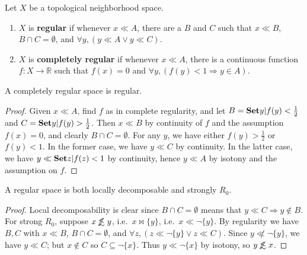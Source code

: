 \documentclass{article}
\def\R{\mathbb{R}}
\def\oapt{\mathrel{\!\not\,\not\lesssim}}
\def\cpl#1{\neg #1}
\let\implies\Rightarrow
\def\singleton#1{\{#1\}}
\begin{document}
\begin{defn}
  Let $X$ be a topological neighborhood space.
  \begin{enumerate}
  \item $X$ is \textbf{regular} if whenever $x\ll A$, there are a $B$ and $C$ such that $x\ll B$, $B\cap C = \emptyset$, and $\forall y, (y\ll A \lor y\ll C)$.
  \item $X$ is \textbf{completely regular} if whenever $x\ll A$, there is a continuous function $f:X\to \R$ such that $f(x)=0$ and $\forall y, (f(y)<1 \implies y\in A)$.
  \end{enumerate}
\end{defn}

\begin{lem}\label{thm:creg-reg}
  A completely regular space is regular.
\end{lem}
\begin{proof}
  Given $x\ll A$, find $f$ as in complete regularity, and let $B = \setof{y|f(y)<\frac12}$ and $C = \setof{y|f(y)>\frac12}$.
  Then $x\ll B$ by continuity of $f$ and the assumption $f(x)=0$, and clearly $B\cap C = \emptyset$.
  For any $y$, we have either $f(y)>\frac12$ or $f(y)<1$.
  In the former case, we have $y \ll C$ by continuity.
  In the latter case, we have $y \ll \setof{z|f(z)<1}$ by continuity, hence $y\ll A$ by isotony and the assumption on $f$.
\end{proof}

\begin{thm}
  A regular space is both locally decomposable and strongly $R_0$.
\end{thm}
\begin{proof}
  Local decomposability is clear since $B\cap C=\emptyset$ means that $y\ll C \implies y\notin B$.
  For strong $R_0$, suppose $x\oapt y$, i.e.\ $x\bowtie \singleton{y}$, i.e.\ $x\ll \cpl{\singleton{y}}$.
  By regularity we have $B,C$ with $x\ll B$, $B\cap C = \emptyset$, and $\forall z, (z\ll \cpl{\singleton{y}} \lor z\ll C)$.
  Since $y\not\ll \cpl{\singleton{y}}$, we have $y\ll C$; but $x\notin C$ so $C\subseteq \cpl{\singleton{x}}$.
  Thus $y\ll\cpl{\singleton{x}}$ by isotony, so $y\oapt x$.
\end{proof}
\end{document}
